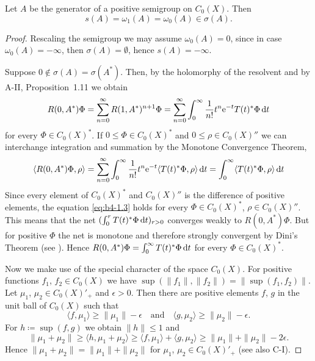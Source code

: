\begin{theorem}\label{thm:b4-1.4}%
Let $A$ be the generator of a positive semigroup on $C_{0}(X)$. 
Then
\[
   s(A) = \omega_1(A) = \omega_{0}(A) \in \sigma(A) .
\]
\end{theorem}
\begin{proof}
Rescaling the semigroup we may assume $\omega_{0}(A) = 0$, 
since in case $\omega_{0}(A) = -\infty$, then $\sigma(A) = \emptyset$, hence $s(A) = -\infty$.

Suppose $0 \notin \sigma(A) = \sigma(A^*)$. 
Then, by the holomorphy of the resolvent and by A-II, Proposition~1.11 we obtain
\[
   R(0,A^*)\Phi = \sum_{n=0}^{\infty} R(1,A^*)^{n+1}\Phi = \sum_{n=0}^{\infty} \int_0^{\infty} \frac{1}{n!} t^n \mathrm{e}^{-t}T(t)^*\Phi \mathop{}\!\mathrm{d}{t}
\]  
 for every  $\Phi \in C_{0}(X)^*$. 
 If $0 \leq \Phi \in C_{0}(X)^*$ and $0 \leq \rho \in C_{0}(X)''$ we can interchange integration and summation by the Monotone Convergence Theorem, \ie
\begin{equation}\label{eq:b4-1.3}
   \langle R(0,A^*)\Phi,\rho \rangle = \sum_{n=0}^{\infty} \int_0^{\infty} \frac{1}{n!} t^n \mathrm{e}^{-t}\langle T(t)^*\Phi,\rho \rangle \mathop{}\!\mathrm{d}{t} = \int_0^{\infty} \langle T(t)^*\Phi,\rho \rangle \mathop{}\!\mathrm{d}{t}
\end{equation}
Since every element of $C_{0}(X)^*$ and $C_{0}(X)''$ is the difference of positive
elements, the equation \eqref{eq:b4-1.3} holds for every $\Phi \in C_{0}(X)^*$, $\rho \in C_{0}(X)''$. 
This means that the net $(\int_0^r T(t)^*\Phi \mathop{}\!\mathrm{d}{t})_{r > 0}$ converges weakly to $R(0,A^*)\Phi$. 
But for positive $\Phi$ the net is monotone and therefore strongly convergent by Dini's Theorem (see \citet[II.Theorem~5.9]{schaefer:1974}). 
Hence $R(0,A^*)\Phi = \int_0^{\infty} T(t)^*\Phi \mathop{}\!\mathrm{d}{t}$ for every $\Phi \in C_{0}(X)^*$.

Now we make use of the special character of the space $C_{0}(X)$. 
For positive functions $f_1$, $f_2 \in C_{0}(X)$ we have $\sup(\|f_1\|,\|f_2\|) = \|\sup(f_1,f_2)\|$. 
Let $\mu_1$, $\mu_2 \in C_{0}(X)'_+$ and $\epsilon  >  0$. 
Then there are positive elements $f$, $g$ in the unit ball of $C_{0}(X)$ such that 
%
\[
	\langle f,\mu_1 \rangle \geq \|\mu_1\| - \epsilon 
	\quad \text{and} \quad
	\langle g,\mu_2 \rangle \geq \|\mu_2\| - \epsilon.
\]
%
For $h \coloneq \sup(f,g)$ we obtain $\|h\| \leq 1$ and 
%
\[
	 \|\mu_1 + \mu_2\| \geq \langle h,\mu_1 + \mu_2 \rangle \geq \langle f,\mu_1 \rangle + \langle g,\mu_2 \rangle \geq \|\mu_1\| + \|\mu_2\| - 2\epsilon .
\]
%
Hence $\|\mu_1 + \mu_2\| = \|\mu_1\| + \|\mu_2\|$ for $\mu_1$, $\mu_2 \in C_{0}(X)'_+$ (see also C-I).


\end{proof}
